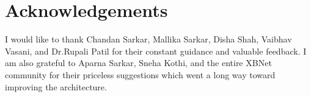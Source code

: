 \documentclass[review]{elsarticle}
\begin{document}
\section{Acknowledgements}
I would like to thank Chandan Sarkar, Mallika Sarkar, Disha Shah, Vaibhav Vasani, and Dr.Rupali Patil for their constant guidance and valuable feedback. I am also grateful to Aparna Sarkar, Sneha Kothi, and the entire XBNet community for their priceless suggestions which went a long way toward improving the architecture. 




\end{document}

